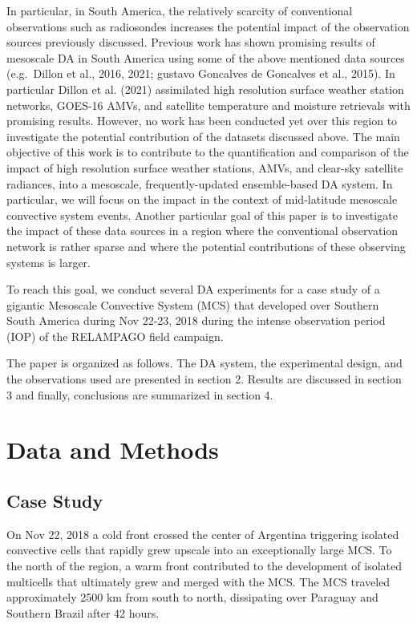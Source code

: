\documentclass[final,5p,times,twocolumn,authoryear]{elsarticle} %
\begin{document}
In particular, in South America, the relatively scarcity of conventional observations such as radiosondes increases the potential impact of the observation sources previously discussed. Previous work has shown promising results of mesoscale DA in South America using some of the above mentioned data sources (e.g.~Dillon et al., 2016, 2021; gustavo Goncalves de Goncalves et al., 2015). In particular Dillon et al. (2021) assimilated high resolution surface weather station networks, GOES-16 AMVs, and satellite temperature and moisture retrievals with promising results. However, no work has been conducted yet over this region to investigate the potential contribution of the datasets discussed above.
The main objective of this work is to contribute to the quantification and comparison of the impact of high resolution surface weather stations, AMVs, and clear-sky satellite radiances, into a mesoscale, frequently-updated ensemble-based DA system. In particular, we will focus on the impact in the context of mid-latitude mesoscale convective system events. Another particular goal of this paper is to investigate the impact of these data sources in a region where the conventional observation network is rather sparse and where the potential contributions of these observing systems is larger.

To reach this goal, we conduct several DA experiments for a case study of a gigantic Mesoscale Convective System (MCS) that developed over Southern South America during Nov 22-23, 2018 during the intense observation period (IOP) of the RELAMPAGO field campaign.

The paper is organized as follows. The DA system, the experimental design, and the observations used are presented in section 2. Results are discussed in section 3 and finally, conclusions are summarized in section 4.

\hypertarget{data-and-methods}{%
\section{Data and Methods}\label{data-and-methods}}

\hypertarget{case-study}{%
\subsection{Case Study}\label{case-study}}

On Nov 22, 2018 a cold front crossed the center of Argentina triggering isolated convective cells that rapidly grew upscale into an exceptionally large MCS. To the north of the region, a warm front contributed to the development of isolated multicells that ultimately grew and merged with the MCS.
The MCS traveled approximately 2500 km from south to north, dissipating over Paraguay and Southern Brazil after 42 hours.
\end{document}
